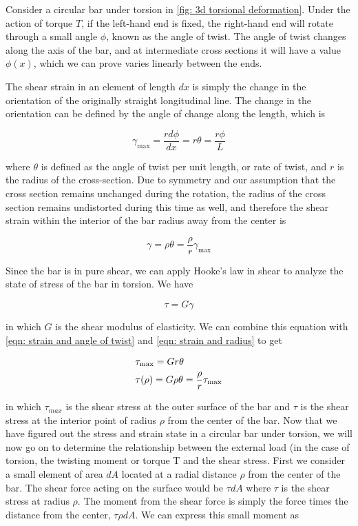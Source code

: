 \documentclass[
10pt,
a4paper,
openany,
svgnames,
]{book} %
\begin{document}
Consider a circular bar under torsion in \cref{fig: 3d torsional deformation}. Under the action of torque $T$, if the left-hand end is fixed, the right-hand end will rotate through a small angle $\phi$, known as the angle of twist. The angle of twist changes along the axis of the bar, and at intermediate cross sections it will have a value $\phi(x)$, which we can prove varies linearly between the ends.

The shear strain in an element of length $dx$ is simply the change in the orientation of the originally straight longitudinal line. The change in the orientation can be defined by the angle of change along the length, which is

\begin{equation} \label{eqn: strain and angle of twist}
  \gamma _{\max } = \frac{{rd\phi }}{{dx}} = r\theta  = \frac{{r\phi }}{L}
\end{equation}

where $\theta$ is defined as the angle of twist per unit length, or rate of twist, and $r$ is the radius of the cross-section. Due to symmetry and our assumption that the cross section remains unchanged during the rotation, the radius of the cross section remains undistorted during this time as well, and therefore the shear strain within the interior of the bar radius away from the center is

\begin{equation} \label{eqn: strain and radius}
  \gamma  = \rho \theta  = \frac{\rho }{r}{\gamma _{\max }}
\end{equation}

Since the bar is in pure shear, we can apply Hooke’s law in shear to analyze the state of stress of the bar in torsion. We have

$$\tau  = G\gamma $$

in which $G$ is the shear modulus of elasticity. We can combine this equation with \cref{eqn: strain and angle of twist} and \cref{eqn: strain and radius} to get

\begin{equation}
  \begin{gathered}
    {\tau _{\max }} = Gr\theta  \hfill \\
    \tau (\rho ) = G\rho \theta  = \dfrac{\rho }{r}{\tau _{\max }} \hfill 
  \end{gathered}
\end{equation}

in which $\tau_{max}$ is the shear stress at the outer surface of the bar and $\tau$ is the shear stress at the interior point of radius $\rho$ from the center of the bar.
Now that we have figured out the stress and strain state in a circular bar under torsion, we will now go on to determine the relationship between the external load (in the case of torsion, the twisting moment or torque T and the shear stress.
First we consider a small element of area $dA$ located at a radial distance $\rho$ from the center of the bar. The shear force acting on the surface would be $\tau dA$ where $\tau$ is the shear stress at radius $\rho$. The moment from the shear force is simply the force times the distance from the center, $\tau \rho dA$. We can express this small moment as
\end{document}
